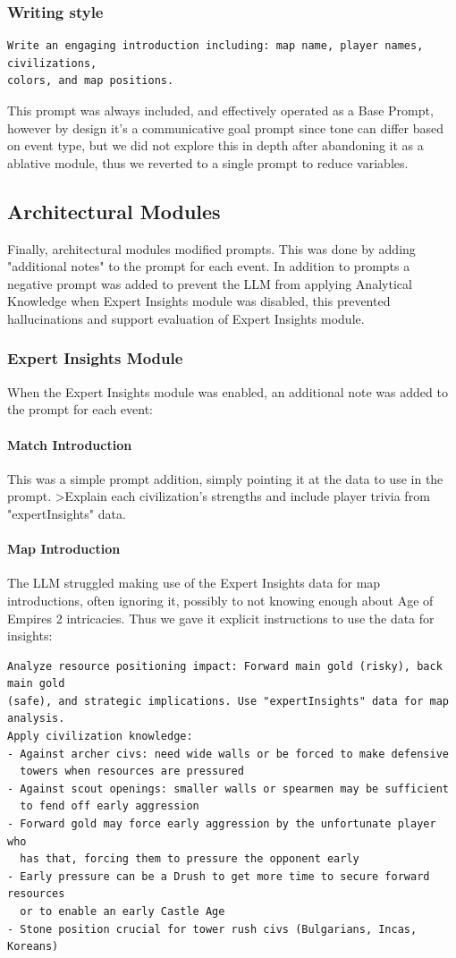 \subsubsection*{Writing style}
\begin{verbatim}
Write an engaging introduction including: map name, player names, civilizations,
colors, and map positions.
\end{verbatim}
This prompt was always included, and effectively operated as a Base Prompt, however by design it's a communicative goal prompt since tone can differ based on event type, but we did not explore this in depth after abandoning it as a ablative module, thus we reverted to a single prompt to reduce variables.

\subsection{Architectural Modules}
\label{appendix:arch-modules-prompts}
Finally, architectural modules modified prompts. This was done by adding "additional notes" to the prompt for each event. In addition to prompts a negative prompt was added to prevent the LLM from applying Analytical Knowledge when Expert Insights module was disabled, this prevented hallucinations and support evaluation of Expert Insights module.

\subsubsection{Expert Insights Module}
When the Expert Insights module was enabled, an additional note was added to the prompt for each event:
\paragraph{Match Introduction} This was a simple prompt addition, simply pointing it at the data to use in the prompt.
>Explain each civilization's strengths and include player trivia from "expertInsights" data.

\paragraph{Map Introduction} The LLM struggled making use of the Expert Insights data for map introductions, often ignoring it, possibly to not knowing enough about Age of Empires 2 intricacies. Thus we gave it explicit instructions to use the data for insights:
\begin{verbatim}
Analyze resource positioning impact: Forward main gold (risky), back main gold
(safe), and strategic implications. Use "expertInsights" data for map analysis.
Apply civilization knowledge:
- Against archer civs: need wide walls or be forced to make defensive
  towers when resources are pressured
- Against scout openings: smaller walls or spearmen may be sufficient
  to fend off early aggression
- Forward gold may force early aggression by the unfortunate player who
  has that, forcing them to pressure the opponent early
- Early pressure can be a Drush to get more time to secure forward resources
  or to enable an early Castle Age
- Stone position crucial for tower rush civs (Bulgarians, Incas, Koreans)
\end{verbatim}

